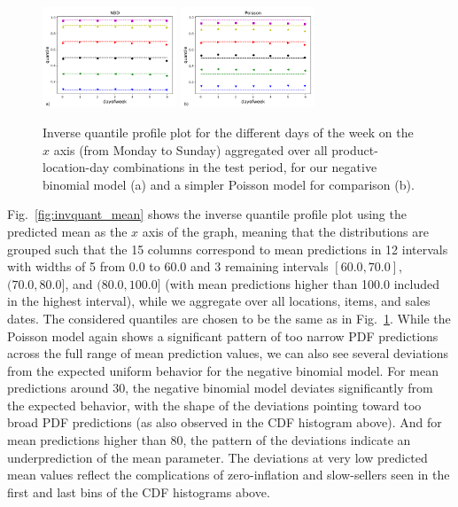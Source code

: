 \documentclass[BCOR=1mm, DIV=calc,10pt,
twoside=true,
twocolumn,
headings=normal]{scrartcl}
\newcommand{\fig}{Fig.~}
\begin{document}
\begin{figure}
\begin{center}
\includegraphics[width=4cm]{invquant_dayofweek_nbinom}
\includegraphics[width=4cm]{invquant_dayofweek_poisson}
\caption{\label{fig:invquant_dayofweek} Inverse quantile profile plot for the different days of the week on the $x$ axis (from Monday to Sunday) aggregated over all product-location-day combinations in the test period, for our negative binomial model (a) and a simpler Poisson model for comparison (b).}
\end{center}
\end{figure}

\fig \ref{fig:invquant_mean} shows the inverse quantile profile plot using the predicted mean as the $x$ axis of the graph, meaning that the distributions are grouped such that the 15 columns correspond to mean predictions in 12 intervals with widths of 5 from 0.0 to 60.0 and 3 remaining intervals $[60.0, 70.0]$, $(70.0, 80.0]$, and $(80.0, 100.0]$ (with mean predictions higher than 100.0 included in the highest interval), while we aggregate over all locations, items, and sales dates. The considered quantiles are chosen to be the same as in \fig \ref{fig:invquant_dayofweek}. While the Poisson model again shows a significant pattern of too narrow PDF predictions across the full range of mean prediction values, we can also see several deviations from the expected uniform behavior for the negative binomial model. For mean predictions around $30$, the negative binomial model deviates significantly from the expected behavior, with the shape of the deviations pointing toward too broad PDF predictions (as also observed in the CDF histogram above). And for mean predictions higher than $80$, the pattern of the deviations indicate an underprediction of the mean parameter. The deviations at very low predicted mean values reflect the complications of zero-inflation and slow-sellers seen in the first and last bins of the CDF histograms above.
\end{document}
